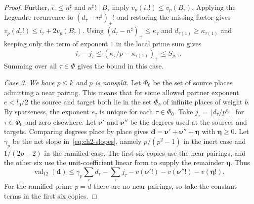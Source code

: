 \begin{proof}
Further, $i_\tau\le n^\sharp$ and $n^\sharp!\mid B_\tau$ imply $v_p(i_\tau!)\le v_p(B_\tau)$. Applying the Legendre recurrence to $(d_\tau-n^\sharp)_+!$ and restoring the missing factor gives $v_p(d_\tau!)\le i_\tau+2v_p(B_\tau)$. Using $(d_\tau-n^\sharp)_+\le\kappa_\tau$ and $d_{\tau(1)}\ge\kappa_{\tau(1)}$ and keeping only the term of exponent $1$ in the local prime sum gives
\[
 i_\tau-j_\tau
  \le (\kappa_\tau/p-\kappa_{\tau(1)})_+
  \le S_{p,\tau}.
\]
Summing over all $\tau\in\Phi$ gives the bound in this case.

\emph{Case 3. We have $p\le k$ and $p$ is nonsplit.} Let $\Phi_0$ be the set of source places admitting a near pairing. This means that for some allowed partner exponent $e<l_0/2$ the source and target both lie in the set $\Phi_b$ of infinite places of weight $b$. By sparseness, the exponent $e_\tau$ is unique for each $\tau\in\Phi_0$. Take $j_\tau=\lfloor d_\tau/p^{e_\tau}\rfloor$ for $\tau\in\Phi_0$ and zero elsewhere. Let $\boldsymbol\nu'$ and $\boldsymbol\nu''$ be the degrees used at the sources and targets. Comparing degrees place by place gives $\boldsymbol d=\boldsymbol\nu'+\boldsymbol\nu''+\boldsymbol\eta$ with $\boldsymbol\eta\ge0$. Let $\gamma_p$ be the net slope in~\eqref{eq:ch2-slopes}, namely $p/(p^2-1)$ in the inert case and $1/(2p-2)$ in the ramified case. The first six copies use the near pairings, and the other six use the unit-coefficient linear form to supply the remainder $\boldsymbol\eta$. Thus
\[
 \operatorname{val}_{12}(\boldsymbol d)
 \le \gamma_p\sum_\tau d_\tau-\sum_\tau j_\tau
    -v(\boldsymbol\nu'!)-v(\boldsymbol\nu''!)-v(\boldsymbol\eta!).
\]
For the ramified prime $p=d$ there are no near pairings, so take the constant terms in the first six copies.


\end{proof}
